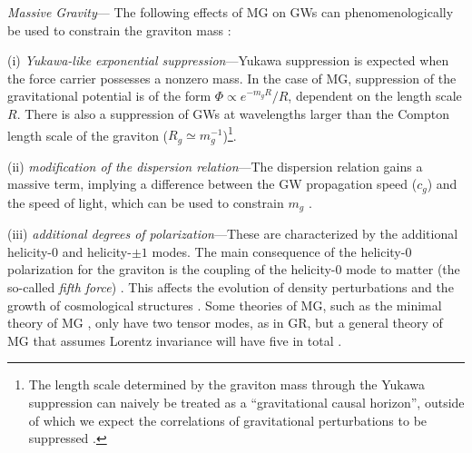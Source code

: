 \documentclass[prd,twocolumn,aps,psfig,nofootinbib,nobibnotes,superscriptaddress,preprintnumbers,times]{revtex4-2}
\begin{document}
\textit{Massive Gravity}---
The following effects of MG on GWs can phenomenologically be used to constrain the graviton mass \cite{deRham:2016nuf}:

(i) \textit{Yukawa-like exponential suppression}---Yukawa suppression is expected when the force carrier possesses a nonzero mass. In the case of MG, suppression of the gravitational potential is of the form $\Phi \propto e^{-m_gR}/R$, dependent on the length scale $R$. There is also a suppression of GWs at wavelengths larger than the Compton length scale of the graviton ($R_g \simeq m_g^{-1}$)\footnote{The length scale determined by the graviton mass through the Yukawa suppression can naively be treated as a ``gravitational causal horizon'', outside of which we expect the correlations of gravitational perturbations to be suppressed \cite{Will:1997bb}.}.

(ii) \textit{modification of the dispersion relation}---The dispersion relation gains a massive term, implying a difference between the GW propagation speed ($c_g$) and the speed of light, which can be used to constrain $m_g$ \cite{LIGOScientific:2017vwq, LIGOScientific:2017zic, LIGOScientific:2017ync}. 

(iii) \textit{additional degrees of polarization}---These are characterized by the additional helicity-$0$ and helicity-$\pm 1$ modes. The main consequence of the helicity-$0$ polarization for the graviton is the coupling of the helicity-0 mode to matter (the so-called {\it fifth force}) \cite{deRham:2014naa}. This affects the evolution of density perturbations and the growth of cosmological structures \cite{Sipp:2022kmb}. Some theories of MG, such as the minimal theory of MG \cite{DeFelice:2015hla}, only have two tensor modes, as in GR, but a general theory of MG that assumes Lorentz invariance will have five in total \cite{Comelli:2013tja}.
\end{document}
